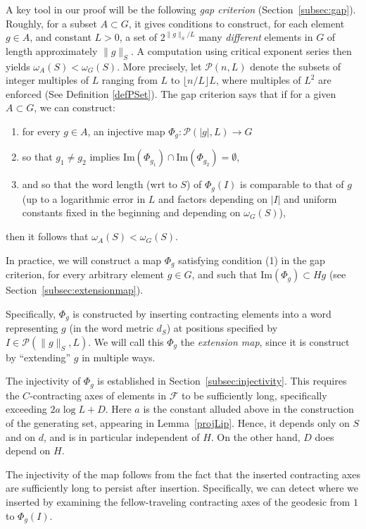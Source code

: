 \documentclass{amsart}
\numberwithin{thm}{section}
\numberwithin{figure}{section}
\theoremstyle{definition}
\theoremstyle{definition}
\theoremstyle{remark}
\numberwithin{equation}{section}
\theoremstyle{plain}
\begin{document}
A key tool in our proof will be the following \emph{gap criterion} (Section~\ref{subsec:gap}).
Roughly, for a subset $A \subset G$, it gives conditions to construct, for each element $g\in A$, and constant $L>0$, a set of $2^{\| g \|_S/L}$ many \emph{different} elements in $G$ of length approximately $\|g\|_S$. A computation using critical exponent series then yields $\omega_A(S) < \omega_G(S)$.
More precisely, let $\mathcal{P}(n,L)$ denote the subsets of integer multiples of $L$ ranging from $L$ to $\lfloor n/L \rfloor L$, where multiples of $L^2$ are enforced (See Definition \ref{defPSet}). 
The gap criterion says that if for a given $A \subset G$,
we can construct:
\begin{enumerate} \item for every $g \in A$, an injective map $\Phi_g \colon \mathcal{P}(|g|,L) \to G$ \item so that $g_1 \neq g_2$ implies $\mathrm{Im}(\Phi_{g_1}) \cap \mathrm{Im}(\Phi_{g_2}) = \emptyset$, 
\item and so that the word length (wrt to $S$) of $\Phi_g(I)$ is comparable to that of $g$ (up to a logarithmic error in $L$ and factors depending on $|I|$ and uniform constants fixed in the beginning and depending on $\omega_G(S)$),
\end{enumerate}
then it follows that $\omega_A(S) < \omega_G(S)$.

In practice, we will construct a map $\Phi_g$ satisfying condition (1) in the gap criterion, for every arbitrary element $g \in G$, and such that $\mathrm{Im}(\Phi_g) \subset Hg$ (see~ Section~\ref{subsec:extensionmap}). 

Specifically, $\Phi_g$ is constructed by inserting contracting elements into a word representing $g$ (in the word metric $d_S$) at positions specified by $I \in \mathcal{P}(\|g\|_S, L)$. We will call this $\Phi_g$ the \emph{extension map}, since it is construct by ``extending'' $g$ in multiple ways.

The injectivity of $\Phi_g$ is established in Section~\ref{subsec:injectivity}. This requires the $C$-contracting axes of elements in $\mathcal{F}$ to be sufficiently long, specifically exceeding $2a \log L + D$. Here $a$ is the constant alluded above in the construction of the generating set, appearing in Lemma~\ref{projLip}. Hence, it depends only on $S$ and on $d$, and is in particular independent of $H$. On the other hand, $D$ does depend on $H$. 

    The injectivity of the map follows from the fact that the inserted contracting axes are sufficiently long to persist after insertion. Specifically, we can detect where we inserted by examining the fellow-traveling contracting axes of the geodesic from $1$ to $\Phi_g(I)$.
    
\end{document}
